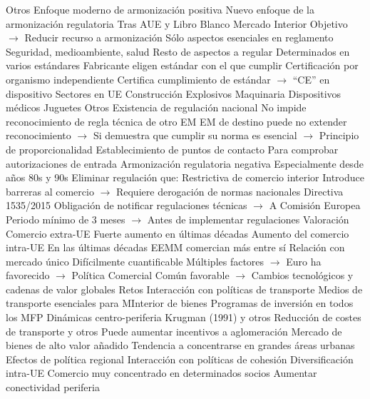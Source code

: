 \documentclass{nuevotema}
\begin{document}
\begin{esquemal}
				\4[] Otros
			\3 Enfoque moderno de armonización positiva
				\4 Nuevo enfoque de la armonización regulatoria
				\4[] Tras AUE y Libro Blanco Mercado Interior
				\4[] Objetivo
				\4[] $\to$ Reducir recurso a armonización
				\4 Sólo aspectos esenciales en reglamento
				\4[] Seguridad, medioambiente, salud
				\4 Resto de aspectos a regular
				\4[] Determinados en varios estándares
				\4[] Fabricante eligen estándar con el que cumplir
				\4 Certificación por organismo independiente
				\4[] Certifica cumplimiento de estándar
				\4[] $\to$ ``CE'' en dispositivo
				\4 Sectores en UE
				\4[] Construcción
				\4[] Explosivos
				\4[] Maquinaria
				\4[] Dispositivos médicos
				\4[] Juguetes
				\4[] Otros
				\4 Existencia de regulación nacional
				\4[] No impide reconocimiento de regla técnica de otro EM
				\4[] EM de destino puede no extender reconocimiento
				\4[] $\to$ Si demuestra que cumplir su norma es esencial
				\4[] $\to$ Principio de proporcionalidad
				\4 Establecimiento de puntos de contacto
				\4[] Para comprobar autorizaciones de entrada
			\3 Armonización regulatoria negativa
				\4 Especialmente desde años 80s y 90s
				\4 Eliminar regulación que:
				\4[] Restrictiva de comercio interior
				\4[] Introduce barreras al comercio
				\4[] $\to$ Requiere derogación de normas nacionales
				\4 Directiva 1535/2015
				\4[] Obligación de notificar regulaciones técnicas
				\4[] $\to$ A Comisión Europea
				\4[] Periodo mínimo de 3 meses
				\4[] $\to$ Antes de implementar regulaciones
		\2 Valoración
			\3 Comercio extra-UE
				\4 Fuerte aumento en últimas décadas
			\3 Aumento del comercio intra-UE
				\4 En las últimas décadas
				\4[] EEMM comercian más entre sí
				\4 Relación con mercado único
				\4[] Difícilmente cuantificable
				\4[] Múltiples factores
				\4[] $\to$ Euro ha favorecido
				\4[] $\to$ Política Comercial Común favorable
				\4[] $\to$ Cambios tecnológicos y cadenas de valor globales
		\2 Retos
			\3 Interacción con políticas de transporte
				\4 Medios de transporte esenciales para MInterior de bienes
				\4 Programas de inversión en todos los MFP
			\3 Dinámicas centro-periferia
				\4 Krugman (1991) y otros
				\4 Reducción de costes de transporte y otros
				\4[] Puede aumentar incentivos a aglomeración
				\4 Mercado de bienes de alto valor añadido
				\4[] Tendencia a concentrarse en grandes áreas urbanas
				\4[$\then$] Efectos de política regional
				\4[$\then$] Interacción con políticas de cohesión
			\3 Diversificación intra-UE
				\4 Comercio muy concentrado en determinados socios
				\4 Aumentar conectividad periferia

\end{esquemal}
\end{document}
